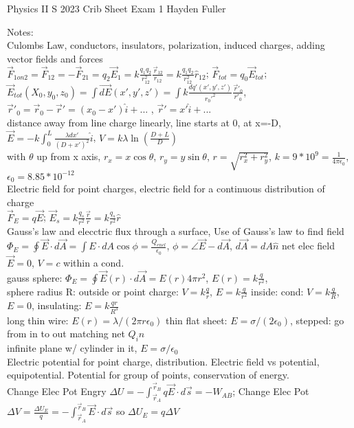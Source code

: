 \documentclass{article}
\begin{document}
Physics II S 2023 Crib Sheet Exam 1 Hayden Fuller
\begin{large}
\noindent Notes:
\\\indent Culombs Law, conductors, insulators, polarization, induced charges, adding vector fields and forces
\\$\vec F_{1on2}=\vec F_{12}=-\vec{F}_{21}=q_2\vec{E}_1=k\frac{q_1q_2}{r_{12}^2}\frac{\vec{r}_{12}}{r_{12}}=k\frac{q_1q_2}{r_{12}^2}\hat r_{12}$; $\vec{F}_{tot}=q_0\vec{E}_{tot}$; $\vec{E}_{tot}(X_0,y_0,z_0)=\int \vec{dE}(x',y',z')=\int k\frac{dq'(x',y',z')}{r_0'^2}\frac{\vec{r}'_0}{r'_0}$, $\vec{r}'_0=\vec{r}_0-\vec{r}'=(x_0-x')\hat i+$... , $\vec{r}'=x'\hat i +$...
\\distance away from line charge linearly, line starts at 0, at x=-D, $\vec{E}=-k\int_0^L\frac{\lambda dx'}{(D+x')^2}\hat i$, $V=k\lambda\ln(\frac{D+L}{D})$
\\with $\theta$ up from x axis, $r_x=x\cos\theta$, $r_y=y\sin\theta$, $r=\sqrt{r_x^2+r_y^2}$, $k=9*10^9=\frac{1}{4\pi \epsilon_0}$, $\epsilon_0=8.85*10^{-12}$
\\\indent Electric field for point charges, electric field for a continuous distribution of charge
\\$\vec{F}_E=q\vec{E}$; $\vec{E}_s=k\frac{q_s}{r^2}\frac{\vec{r}}{r}=k\frac{q_s}{r^2}\hat r$
\\\indent Gauss's law and elecctric flux through a surface, Use of Gauss's law to find field
\\$\Phi_E=\oint\vec{E}\cdot d\vec{A}=\int E \cdot dA \cos \phi=\frac{Q_{encl}}{\epsilon_0}$, $\phi=\angle \vec E-d\vec A$, $d\vec A= dA\hat n$ net elec field $\vec{E}=0$, $V=c$ within a cond.
\\gauss sphere: $\Phi_E=\oint\vec E (r)\cdot d\vec A=E(r)4\pi r^2$, $E(r)=k\frac{q}{r^2}$,
\\sphere radius R: outside or point charge: $V=k\frac{q}{r}$, $E=k \frac{q}{r^2}$ inside: cond: $V=k\frac{q}{R}$, $E=0$, insulating: $E=k\frac{qr}{R^3}$
\\long thin wire: $E(r)=\lambda/(2\pi r\epsilon_0)$ \quad thin flat sheet: $E=\sigma/(2\epsilon_0)$, stepped: go from in to out matching net $Q_in$
\\infinite plane w/ cylinder in it, $E=\sigma/\epsilon_0$
\\\indent Electric potential for point charge, distribution. Electric field vs potential, equipotential. Potential for group of points, conservation of energy.
\\Change Elec Pot Engry $\Delta U=-\int_{\vec{r}_A}^{\vec{r}_B} q\vec{E}\cdot d\vec{s}=-W_{AB}$; Change Elec Pot $\Delta V =\frac{\Delta U_E}{q}= -\int_{\vec{r}_A}^{\vec{r}_B} \vec{E}\cdot d\vec{s}$ so $\Delta U_E = q\Delta V$

\end{large}
\end{document}
